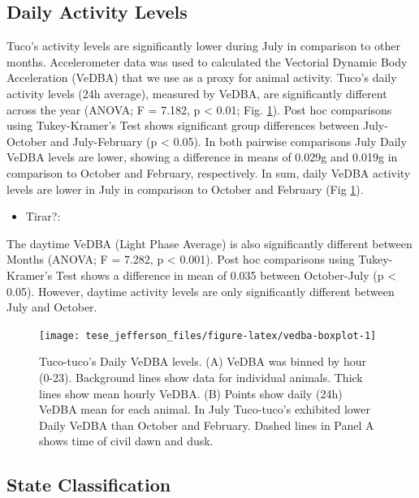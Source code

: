 \documentclass[english,msc,numbers,hidelinks]{coppe}
\providecommand{\tightlist}{%
  \setlength{\itemsep}{0pt}\setlength{\parskip}{0pt}}
\begin{document}
  \hypertarget{daily-activity-levels}{%
  \subsection{Daily Activity Levels}\label{daily-activity-levels}}

  Tuco's activity levels are significantly lower during July in comparison to other months. Accelerometer data was used to calculated the Vectorial Dynamic Body Acceleration (VeDBA) that we use as a proxy for animal activity. Tuco's daily activity levels (24h average), measured by VeDBA, are significantly different across the year (ANOVA; F = 7.182, p \textless{} 0.01; Fig. \ref{fig:vedba-boxplot}). Post hoc comparisons using Tukey-Kramer's Test shows significant group differences between July-October and July-February (p \textless{} 0.05). In both pairwise comparisons July Daily VeDBA levels are lower, showing a difference in means of 0.029g and 0.019g in comparison to October and February, respectively. In sum, daily VeDBA activity levels are lower in July in comparison to October and February (Fig \ref{fig:vedba-boxplot}).
  \begin{itemize}
  \tightlist
  \item
    Tirar?:
  \end{itemize}
  The daytime VeDBA (Light Phase Average) is also significantly different between Months (ANOVA; F = 7.282, p \textless{} 0.001). Post hoc comparisons using Tukey-Kramer's Test shows a difference in mean of 0.035 between October-July (p \textless{} 0.05). However, daytime activity levels are only significantly different between July and October.
  \begin{figure}

  {\centering \texttt{[image: tese\_jefferson\_files/figure-latex/vedba-boxplot-1]} 

  }

  \caption{Tuco-tuco's Daily VeDBA levels. (A) VeDBA was binned by hour (0-23). Background lines show data for individual animals. Thick lines show mean hourly VeDBA. (B) Points show daily (24h) VeDBA mean for each animal. In July Tuco-tuco's exhibited lower Daily VeDBA than October and February. Dashed lines in Panel A shows time of civil dawn and dusk.}\label{fig:vedba-boxplot}
  \end{figure}
  \hypertarget{state-classification}{%
  \subsection{State Classification}\label{state-classification}}
\end{document}
